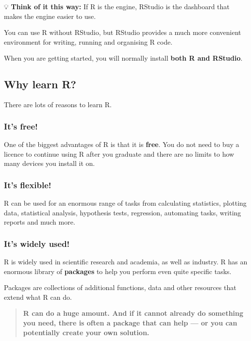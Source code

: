 \documentclass[
]{book}
\begin{document}
💡 \textbf{Think of it this way:}
If R is the engine, RStudio is the dashboard that makes the engine easier to use.

You can use R without RStudio, but RStudio provides a much more convenient environment for writing, running and organising R code.

When you are getting started, you will normally install \textbf{both R and RStudio}.

\subsection{Why learn R?}\label{why-learn-r}

There are lots of reasons to learn R.

\subsubsection{It's free!}\label{its-free}

One of the biggest advantages of R is that it is \textbf{free}. You do not need to buy a licence to continue using R after you graduate and there are no limits to how many devices you install it on.

\subsubsection{It's flexible!}\label{its-flexible}

R can be used for an enormous range of tasks from calculating statistics, plotting data, statistical analysis, hypothesis tests, regression, automating tasks, writing reports and much more.

\subsubsection{It's widely used!}\label{its-widely-used}

R is widely used in scientific research and academia, as well as industry. R has an enormous library of \textbf{packages} to help you perform even quite specific tasks.

Packages are collections of additional functions, data and other resources that extend what R can do.

\begin{quote}
\textbf{R can do a huge amount. And if it cannot already do something you need, there is often a package that can help --- or you can potentially create your own solution.}
\end{quote}
\end{document}
